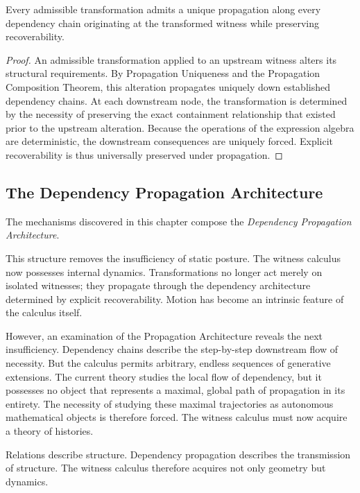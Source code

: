 \documentclass[12pt,anyside]{book}
\begin{document}
\begin{theorem}
Every admissible transformation admits a unique propagation along every dependency chain originating at the transformed witness while preserving recoverability.
\end{theorem}
\begin{proof}
An admissible transformation applied to an upstream witness alters its structural requirements. By Propagation Uniqueness and the Propagation Composition Theorem, this alteration propagates uniquely down established dependency chains. At each downstream node, the transformation is determined by the necessity of preserving the exact containment relationship that existed prior to the upstream alteration. Because the operations of the expression algebra are deterministic, the downstream consequences are uniquely forced. Explicit recoverability is thus universally preserved under propagation.
\end{proof}

\subsection{The Dependency Propagation Architecture}
The mechanisms discovered in this chapter compose the \textit{Dependency Propagation Architecture}. 

This structure removes the insufficiency of static posture. The witness calculus now possesses internal dynamics. Transformations no longer act merely on isolated witnesses; they propagate through the dependency architecture determined by explicit recoverability. Motion has become an intrinsic feature of the calculus itself.

However, an examination of the Propagation Architecture reveals the next insufficiency. Dependency chains describe the step-by-step downstream flow of necessity. But the calculus permits arbitrary, endless sequences of generative extensions. The current theory studies the local flow of dependency, but it possesses no object that represents a maximal, global path of propagation in its entirety. The necessity of studying these maximal trajectories as autonomous mathematical objects is therefore forced. The witness calculus must now acquire a theory of histories.

Relations describe structure. Dependency propagation describes the transmission of structure. The witness calculus therefore acquires not only geometry but dynamics.
\end{document}

